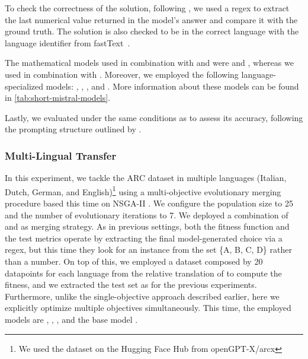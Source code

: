 To check the correctness of the solution, following \citet{sakana}, we used a regex to extract the last numerical value returned in the model's answer and compare it with the ground truth. The solution is also checked to be in the correct language with the language identifier from fastText~\cite{joulin2017bag}.

The mathematical models used in combination with  and  were  and , whereas we used  in combination with . Moreover, we employed the following language-specialized models: , , , and . More information about these models can be found in \cref{tab:short-mistral-models}.

Lastly, we evaluated  \cite{sakana} under the same conditions as \approach{} to assess its accuracy, following the prompting structure outlined by \citet{sakana}.

\subsubsection{Multi-Lingual Transfer}

In this experiment, we tackle the ARC dataset in multiple languages (Italian, Dutch, German, and English)\footnote{We used the dataset on the Hugging Face Hub from openGPT-X/arcx} \cite{thellmann2024crosslingual} using a multi-objective evolutionary merging procedure based this time on NSGA-II \cite{nsga-ii}. We configure the population size to 25 and the number of evolutionary iterations to 7. We deployed a combination of  and  as merging strategy. As in previous settings, both the fitness function and the test metrics operate by extracting the final model-generated choice via a regex, but this time they look for an instance from the set \{A, B, C, D\} rather than a number. On top of this, we employed a dataset composed by 20 datapoints for each language from the relative translation of  to compute the fitness, and we extracted the test set as for the previous experiments. Furthermore, unlike the single-objective approach described earlier, here we explicitly optimize multiple objectives simultaneously. This time, the employed models are , , , and the base model . 

